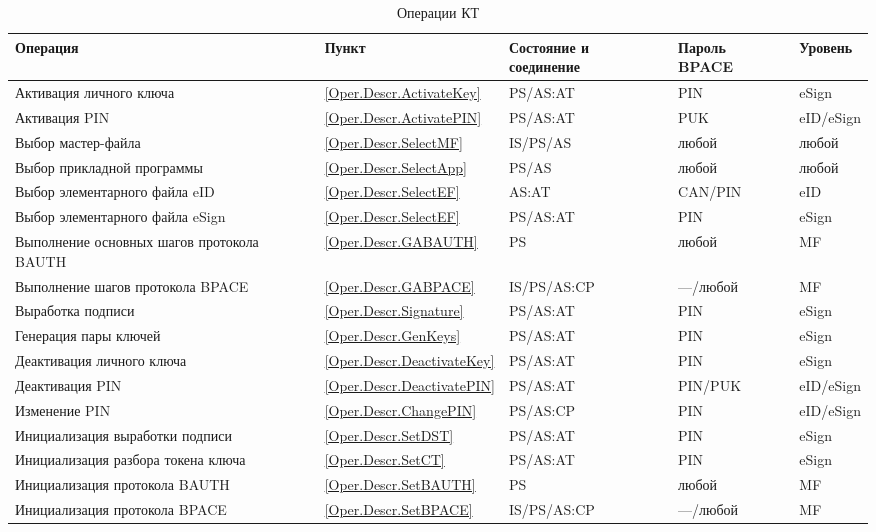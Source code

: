 \begin{table}[p]
\caption{Операции КТ}
\label{Table.Oper.List}
\begin{tabular}{|p{7.5cm}|p{1.3cm}|p{2.6cm}|p{1.8cm}| p{1.7cm}|}
\hline
Операция & Пункт & Состояние и соединение & Пароль BPACE & Уровень \\
\hline
\hline
Активация личного ключа & \ref{Oper.Descr.ActivateKey} & PS/AS:AT & PIN & eSign\\ 
\hline
Активация PIN & \ref{Oper.Descr.ActivatePIN} & PS/AS:AT & PUK & eID/eSign\\
\hline
Выбор мастер-файла & \ref{Oper.Descr.SelectMF} & IS/PS/AS & любой & любой\\
\hline
Выбор прикладной программы & \ref{Oper.Descr.SelectApp} & PS/AS & любой & любой\\ 
\hline
Выбор элементарного файла eID & \ref{Oper.Descr.SelectEF} & AS:AT & CAN/PIN & 
eID \\ 
\hline
Выбор элементарного файла eSign & \ref{Oper.Descr.SelectEF} & PS/AS:AT & PIN & 
eSign \\ 
\hline
Выполнение основных шагов протокола BAUTH & \ref{Oper.Descr.GABAUTH} & PS & 
любой & MF \\ 
\hline
Выполнение шагов протокола BPACE & \ref{Oper.Descr.GABPACE} & IS/PS/AS:CP & 
---/любой & MF \\ 
\hline
Выработка подписи & \ref{Oper.Descr.Signature} & PS/AS:AT & PIN & eSign \\
\hline
Генерация пары ключей & \ref{Oper.Descr.GenKeys} & PS/AS:AT & PIN & eSign \\
\hline
Деактивация личного ключа & \ref{Oper.Descr.DeactivateKey}  & PS/AS:AT & PIN & 
eSign\\ 
\hline
Деактивация PIN & \ref{Oper.Descr.DeactivatePIN}  & PS/AS:AT & PIN/PUK & 
eID/eSign\\ 
\hline
Изменение PIN & \ref{Oper.Descr.ChangePIN} & PS/AS:CP & PIN & eID/eSign \\
\hline
Инициализация выработки подписи & \ref{Oper.Descr.SetDST} & PS/AS:AT 
& PIN & eSign \\ 
\hline
Инициализация разбора токена ключа & \ref{Oper.Descr.SetCT} & 
PS/AS:AT & PIN & eSign \\ 
\hline
Инициализация протокола BAUTH & \ref{Oper.Descr.SetBAUTH} & PS & любой & MF \\ 
\hline
Инициализация протокола BPACE & \ref{Oper.Descr.SetBPACE} & IS/PS/AS:CP & 
---/любой & MF \\ 

\end{tabular}
\end{table}
